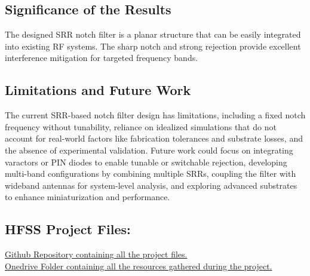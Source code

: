 \documentclass[conference]{IEEEtran}
\begin{document}
\subsection{Significance of the Results}
The designed SRR notch filter is a planar structure that can be easily integrated into existing RF systems. The sharp notch and strong rejection provide excellent interference mitigation for targeted frequency bands. 

\subsection{Limitations and Future Work}
The current SRR-based notch filter design has limitations, including a fixed notch frequency without tunability, reliance on idealized simulations that do not account for real-world factors like fabrication tolerances and substrate losses, and the absence of experimental validation. Future work could focus on integrating varactors or PIN diodes to enable tunable or switchable rejection, developing multi-band configurations by combining multiple SRRs, coupling the filter with wideband antennas for system-level analysis, and exploring advanced substrates to enhance miniaturization and performance.

\subsection{HFSS Project Files:}
\href{https://github.com/MadhanSaiKrishna/Planar-Resonator-Structure}{Github Repository containing all the project files.} \\
\href{https://iiithydstudents-my.sharepoint.com/my?id=%2Fpersonal%2Fchamarthymadhan%5Fk%5Fstudents%5Fiiit%5Fac%5Fin%2FDocuments%2FSRR&ga=1}{Onedrive Folder containing all the resources gathered during the project.}  
\end{document}
